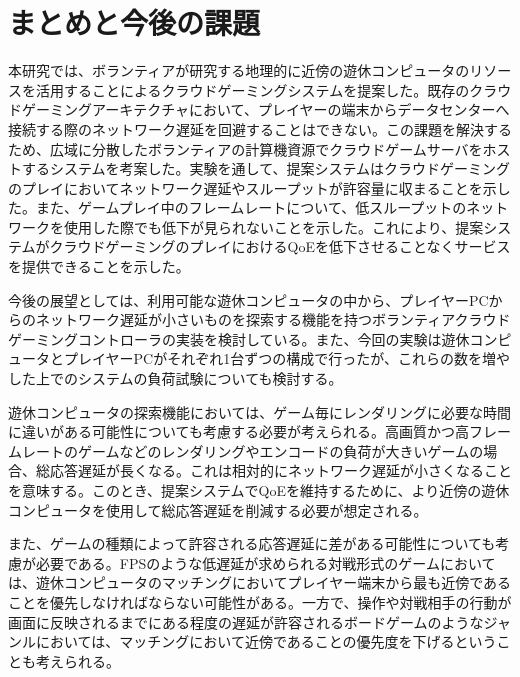 \section{まとめと今後の課題}
本研究では、ボランティアが研究する地理的に近傍の遊休コンピュータのリソースを活用することによるクラウドゲーミングシステムを提案した。既存のクラウドゲーミングアーキテクチャにおいて、プレイヤーの端末からデータセンターへ接続する際のネットワーク遅延を回避することはできない。この課題を解決するため、広域に分散したボランティアの計算機資源でクラウドゲームサーバをホストするシステムを考案した。実験を通して、提案システムはクラウドゲーミングのプレイにおいてネットワーク遅延やスループットが許容量に収まることを示した。また、ゲームプレイ中のフレームレートについて、低スループットのネットワークを使用した際でも低下が見られないことを示した。これにより、提案システムがクラウドゲーミングのプレイにおけるQoEを低下させることなくサービスを提供できることを示した。

今後の展望としては、利用可能な遊休コンピュータの中から、プレイヤーPCからのネットワーク遅延が小さいものを探索する機能を持つボランティアクラウドゲーミングコントローラの実装を検討している。また、今回の実験は遊休コンピュータとプレイヤーPCがそれぞれ1台ずつの構成で行ったが、これらの数を増やした上でのシステムの負荷試験についても検討する。%

遊休コンピュータの探索機能においては、ゲーム毎にレンダリングに必要な時間に違いがある可能性についても考慮する必要が考えられる。高画質かつ高フレームレートのゲームなどのレンダリングやエンコードの負荷が大きいゲームの場合、総応答遅延が長くなる。これは相対的にネットワーク遅延が小さくなることを意味する。このとき、提案システムでQoEを維持するために、より近傍の遊休コンピュータを使用して総応答遅延を削減する必要が想定される。

また、ゲームの種類によって許容される応答遅延に差がある可能性についても考慮が必要である。FPSのような低遅延が求められる対戦形式のゲームにおいては、遊休コンピュータのマッチングにおいてプレイヤー端末から最も近傍であることを優先しなければならない可能性がある。一方で、操作や対戦相手の行動が画面に反映されるまでにある程度の遅延が許容されるボードゲームのようなジャンルにおいては、マッチングにおいて近傍であることの優先度を下げるということも考えられる。

